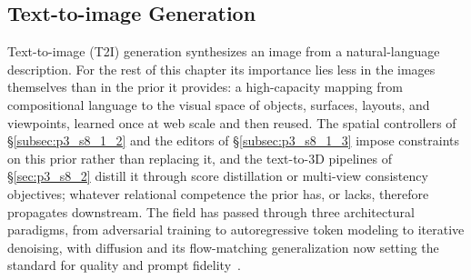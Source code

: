 \subsection{Text-to-image Generation}
\label{subsec:t2i}
\label{subsec:p3_s8_1_1}

Text-to-image (T2I) generation synthesizes an image from a natural-language description.
For the rest of this chapter its importance lies less in the images themselves than in the prior it provides: a high-capacity mapping from compositional language to the visual space of objects, surfaces, layouts, and viewpoints, learned once at web scale and then reused.
The spatial controllers of §\ref{subsec:p3_s8_1_2} and the editors of §\ref{subsec:p3_s8_1_3} impose constraints on this prior rather than replacing it, and the text-to-3D pipelines of §\ref{sec:p3_s8_2} distill it through score distillation or multi-view consistency objectives; whatever relational competence the prior has, or lacks, therefore propagates downstream.
The field has passed through three architectural paradigms, from adversarial training to autoregressive token modeling to iterative denoising, with diffusion and its flow-matching generalization now setting the standard for quality and prompt fidelity~\cite{rombach2022ldm,peebles2023dit}.


